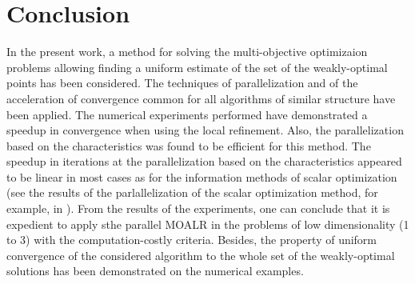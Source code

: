 \documentclass{llncs}
\begin{document}
\section{Conclusion}
In the present work, a method for solving the multi-objective optimizaion problems allowing
finding a uniform estimate of the set of the weakly-optimal points has been considered. The
techniques of parallelization and of the acceleration of convergence common for all algorithms
of similar structure have been applied. The numerical experiments performed have
demonstrated a speedup in convergence when using the local refinement. Also, the
parallelization based on the characteristics was found to be efficient for this method. The
speedup in iterations at the parallelization based on the characteristics appeared to be linear in
most cases as for the information methods of scalar optimization (see the results of the
parlallelization of the scalar optimization method, for example, in
\cite{barkalovLebedef2016}). From the results of the experiments, one can conclude that it is
expedient to apply sthe parallel MOALR in the problems of low dimensionality (1 to 3) with
the computation-costly criteria. Besides, the property of uniform convergence of the considered
algorithm to the whole set of the weakly-optimal solutions has been demonstrated on the
numerical examples.
%
%
%
%

%


\clearpage
{} %
\renewcommand{\indexname}{Author Index}
\printindex
\clearpage
\end{document}
